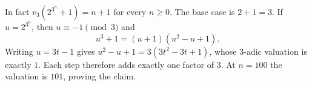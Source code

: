 In fact $v_3(2^{3^n}+1)=n+1$ for every $n\ge0$. The base case is $2+1=3$. If $u=2^{3^n}$, then $u\equiv-1\pmod3$ and
\[
u^3+1=(u+1)(u^2-u+1).
\]
Writing $u=3t-1$ gives $u^2-u+1=3(3t^2-3t+1)$, whose 3-adic valuation is exactly $1$. Each step therefore adds exactly one factor of $3$. At $n=100$ the valuation is $101$, proving the claim.
